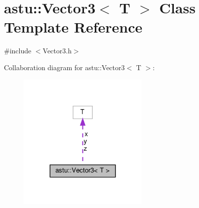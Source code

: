 \hypertarget{classastu_1_1Vector3}{}\section{astu\+:\+:Vector3$<$ T $>$ Class Template Reference}
\label{classastu_1_1Vector3}


{\ttfamily \#include $<$Vector3.\+h$>$}



Collaboration diagram for astu\+:\+:Vector3$<$ T $>$\+:\nopagebreak
\begin{figure}[H]
\begin{center}
\leavevmode
\includegraphics[width=179pt]{classastu_1_1Vector3__coll__graph}
\end{center}
\end{figure}
